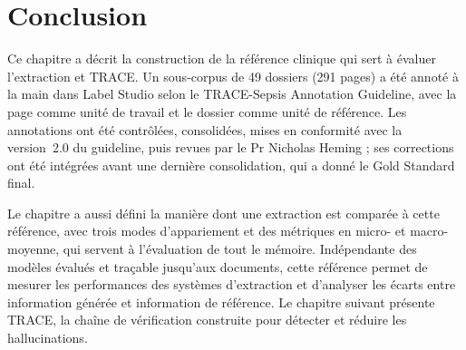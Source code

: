 \section{Conclusion}\label{sec:c3-3-13}

Ce chapitre a décrit la construction de la référence clinique qui sert à évaluer l'extraction et TRACE. Un sous-corpus de 49 dossiers (291 pages) a été annoté à la main dans Label Studio selon le TRACE-Sepsis Annotation Guideline, avec la page comme unité de travail et le dossier comme unité de référence. Les annotations ont été contrôlées, consolidées, mises en conformité avec la version~2.0 du guideline, puis revues par le Pr Nicholas Heming ; ses corrections ont été intégrées avant une dernière consolidation, qui a donné le Gold Standard final.

Le chapitre a aussi défini la manière dont une extraction est comparée à cette référence, avec trois modes d'appariement et des métriques en micro- et macro-moyenne, qui servent à l'évaluation de tout le mémoire. Indépendante des modèles évalués et traçable jusqu'aux documents, cette référence permet de mesurer les performances des systèmes d'extraction et d'analyser les écarts entre information générée et information de référence. Le chapitre suivant présente TRACE, la chaîne de vérification construite pour détecter et réduire les hallucinations.
